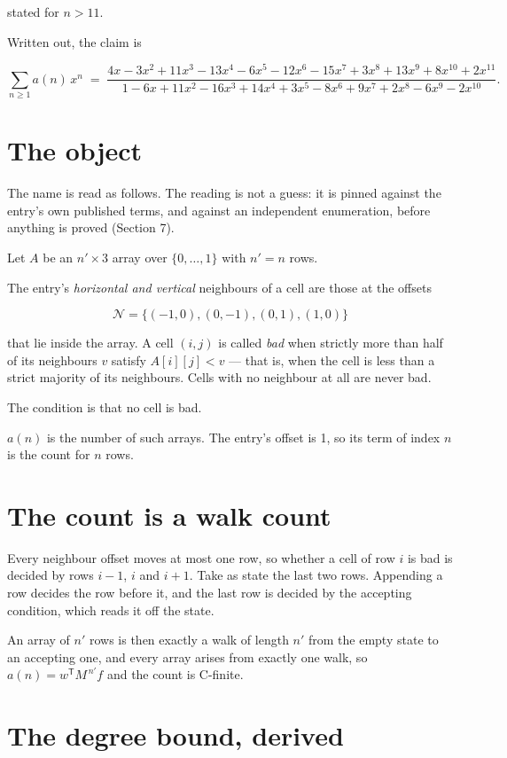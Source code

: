 \documentclass[11pt]{article}
\theoremstyle{definition}
\begin{document}
stated for $n > 11$.

Written out, the claim is

\[\sum_{n \ge 1} a(n)\,x^n \;=\; \frac{4x - 3x^{2} + 11x^{3} - 13x^{4} - 6x^{5} - 12x^{6} - 15x^{7} + 3x^{8} + 13x^{9} + 8x^{10} + 2x^{11}}{1 - 6x + 11x^{2} - 16x^{3} + 14x^{4} + 3x^{5} - 8x^{6} + 9x^{7} + 2x^{8} - 6x^{9} - 2x^{10}}.\]

\section{The object}

The name is read as follows. The reading is not a guess: it is pinned against the entry's own published terms, and against an independent enumeration, before anything is proved (Section 7).

Let $A$ be an $n' \times 3$ array over $\{0,\dots,1\}$ with $n' = n$ rows.

The entry's {\itshape horizontal and vertical} neighbours of a cell are those at the offsets

\[\mathcal{N} = \{(-1,0), (0,-1), (0,1), (1,0)\}\]

that lie inside the array. A cell $(i,j)$ is called {\itshape bad} when strictly more than half of its neighbours $v$ satisfy $A[i][j] < v$ --- that is, when the cell is less than a strict majority of its neighbours. Cells with no neighbour at all are never bad.

The condition is that no cell is bad.

$a(n)$ is the number of such arrays. The entry's offset is 1, so its term of index $n$ is the count for $n$ rows.

\section{The count is a walk count}

Every neighbour offset moves at most one row, so whether a cell of row $i$ is bad is decided by rows $i-1$, $i$ and $i+1$. Take as state the last two rows. Appending a row decides the row before it, and the last row is decided by the accepting condition, which reads it off the state.

An array of $n'$ rows is then exactly a walk of length $n'$ from the empty state to an accepting one, and every array arises from exactly one walk, so $a(n) = w^{\mathsf T}M^{\,n'}f$ and the count is C-finite.

\section{The degree bound, derived}
\end{document}
